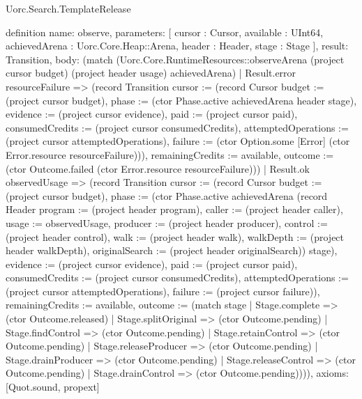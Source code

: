 \begin{lexlean}{Uorc.Search.TemplateRelease}
\begin{semanticmodule}
definition{
  name: observe,
  parameters: [
    cursor : Cursor,
    available : UInt64,
    achievedArena : Uorc.Core.Heap::Arena,
    header : Header,
    stage : Stage
  ],
  result: Transition,
  body: (match (Uorc.Core.RuntimeResources::observeArena (project cursor budget) (project header usage) achievedArena)
    | Result.error resourceFailure => (record Transition {cursor := (record Cursor {budget := (project cursor budget), phase := (ctor Phase.active achievedArena header stage), evidence := (project cursor evidence), paid := (project cursor paid), consumedCredits := (project cursor consumedCredits), attemptedOperations := (project cursor attemptedOperations), failure := (ctor Option.some [Error] (ctor Error.resource resourceFailure))}), remainingCredits := available, outcome := (ctor Outcome.failed (ctor Error.resource resourceFailure))})
    | Result.ok observedUsage => (record Transition {cursor := (record Cursor {budget := (project cursor budget), phase := (ctor Phase.active achievedArena (record Header {program := (project header program), caller := (project header caller), usage := observedUsage, producer := (project header producer), control := (project header control), walk := (project header walk), walkDepth := (project header walkDepth), originalSearch := (project header originalSearch)}) stage), evidence := (project cursor evidence), paid := (project cursor paid), consumedCredits := (project cursor consumedCredits), attemptedOperations := (project cursor attemptedOperations), failure := (project cursor failure)}), remainingCredits := available, outcome := (match stage
      | Stage.complete => (ctor Outcome.released)
      | Stage.splitOriginal => (ctor Outcome.pending)
      | Stage.findControl => (ctor Outcome.pending)
      | Stage.retainControl => (ctor Outcome.pending)
      | Stage.releaseProducer => (ctor Outcome.pending)
      | Stage.drainProducer => (ctor Outcome.pending)
      | Stage.releaseControl => (ctor Outcome.pending)
      | Stage.drainControl => (ctor Outcome.pending))})),
  axioms: [Quot.sound, propext]
}


\end{semanticmodule}
\end{lexlean}

